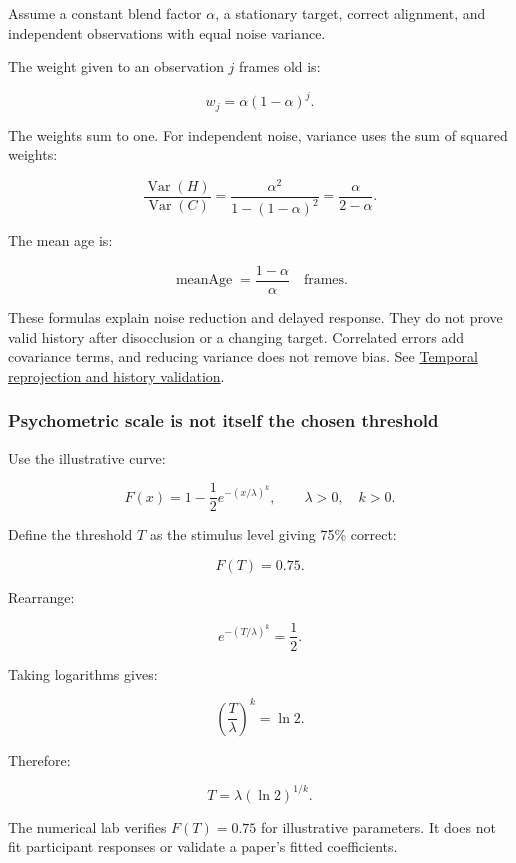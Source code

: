 \hypertarget{04-visual-computing-ii-ch042-temporal-variance-and-age-are-conditional-results}{}

Assume a constant blend factor \(\alpha\), a stationary target, correct alignment, and independent observations with equal noise variance.

The weight given to an observation \(j\) frames old is:

\[
w_j=\alpha(1-\alpha)^j.
\]

The weights sum to one. For independent noise, variance uses the sum of squared weights:

\[
\frac{\operatorname{Var}(H)}{\operatorname{Var}(C)}
=\frac{\alpha^2}{1-(1-\alpha)^2}
=\frac{\alpha}{2-\alpha}.
\]

The mean age is:

\[
\operatorname{meanAge}=\frac{1-\alpha}{\alpha}
\quad\text{frames}.
\]

These formulas explain noise reduction and delayed response. They do not prove valid history after disocclusion or a changing target. Correlated errors add covariance terms, and reducing variance does not remove bias. See \hyperref[appendix-0727340a4428]{Temporal reprojection and history validation}.

\subsubsection{Psychometric scale is not itself the chosen threshold}\label{04-visual-computing-ii-ch042-psychometric-scale-is-not-itself-the-chosen-threshold}

\hypertarget{04-visual-computing-ii-ch042-psychometric-scale-is-not-itself-the-chosen-threshold}{}

Use the illustrative curve:

\[
F(x)=1-\frac12e^{-(x/\lambda)^k},
\qquad \lambda>0,\quad k>0.
\]

Define the threshold \(T\) as the stimulus level giving 75\% correct:

\[
F(T)=0.75.
\]

Rearrange:

\[
e^{-(T/\lambda)^k}=\frac12.
\]

Taking logarithms gives:

\[
\left(\frac{T}{\lambda}\right)^k=\ln2.
\]

Therefore:

\[
T=\lambda(\ln2)^{1/k}.
\]

The numerical lab verifies \(F(T)=0.75\) for illustrative parameters. It does not fit participant responses or validate a paper's fitted coefficients.

